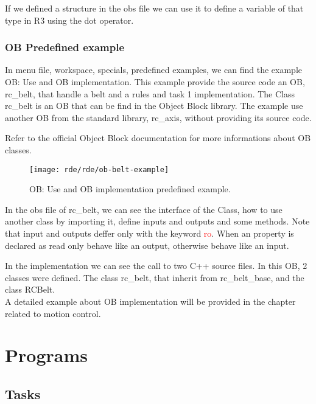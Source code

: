 If we defined a structure in the obs file we can use it to define a variable of that type in R3 using the dot operator.

%	
\subsubsection{OB Predefined example}
In menu file, workspace, specials, predefined examples, we can find the example OB: Use and OB implementation. This example provide the source code an OB, rc\_belt, that handle a belt and a rules and task 1 implementation.
The Class rc\_belt is an OB that can be find in the Object Block library. The example use another OB from the standard library, rc\_axis, without providing its source code.

Refer to the official Object Block documentation for more informations about OB classes.

\begin{figure}[h]
	\centering\texttt{[image: rde/rde/ob-belt-example]}
	\caption{OB: Use and OB implementation predefined example.}
	\label{fig:obbeltexample}
\end{figure}

In the obs file of rc\_belt, we can see the interface of the Class, how to use another class by importing it, define inputs and outputs and some methods. Note that input and outputs deffer only with the keyword \textcolor{red}{ro}. When an property is declared as read only behave like an output, otherwise behave like an input.

In the implementation we can see the call to two C++ source files. In this OB, 2 classes were defined. The class rc\_belt, that inherit from rc\_belt\_base, and the class RCBelt.\\

A detailed example about OB implementation will be provided in the chapter related to motion control.

\section{Programs}

%	
\subsection{Tasks}

